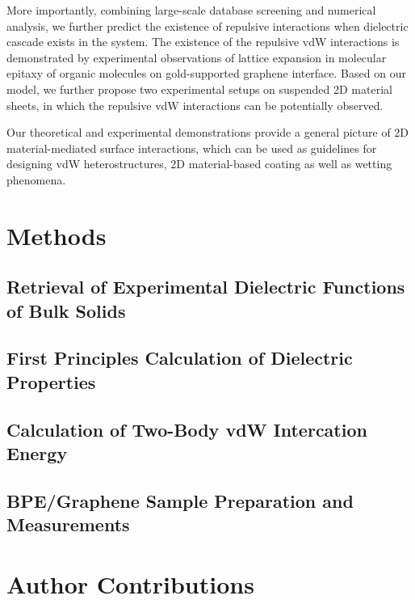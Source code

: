 More importantly, combining large-scale database screening and
numerical analysis, we further predict the existence of repulsive
interactions when dielectric cascade exists in the system. The
existence of the repulsive vdW interactions is demonstrated by
experimental observations of lattice expansion in molecular epitaxy of
organic molecules on gold-supported graphene interface.
%
Based on our model, we further propose two experimental setups on
suspended 2D material sheets, in which the repulsive vdW interactions
can be potentially observed.

Our theoretical and experimental demonstrations provide a general
picture of 2D material-mediated surface interactions, which can be
used as guidelines for designing vdW heterostructures, 2D
material-based coating as well as wetting phenomena.


\section{Methods}
\label{sec:vdw-methods}
\subsection{Retrieval of Experimental Dielectric Functions of Bulk Solids}
\label{sec:retr-exper-diel}



\subsection{First Principles Calculation of Dielectric Properties}
\label{sec:firsc-diel-prop}


\subsection{Calculation of Two-Body vdW Intercation Energy}
\label{sec:calculation-two-body}

\subsection{BPE/Graphene Sample Preparation and Measurements}
\label{sec:graph-sample-prep}

\section{Author Contributions}
\label{sec:vdw-author-contributions}











